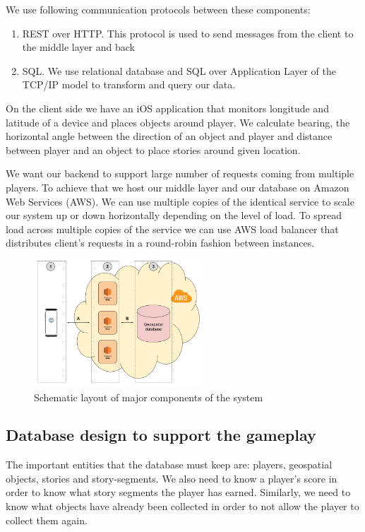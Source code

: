 \documentclass[conference]{IEEEtran}
\begin{document}
We use following communication protocols between these components:

\begin{enumerate}[label=\Alph*]
\item REST over HTTP. This protocol is used to send messages from the client to the middle layer and back
\item SQL. We use relational database and SQL over Application Layer of the TCP/IP model to transform and query our data. 
\end{enumerate}

On the client side we have an iOS application that monitors longitude and latitude of a device and places objects around player. We calculate bearing, the horizontal angle between the direction of an object and player and distance between player and an object to place stories around given location. 

We want our backend to support large number of requests coming from multiple players. To achieve that we host our middle layer and our database on  Amazon Web Services (AWS).  We can use multiple copies of the identical service to scale our system up or down horizontally depending on the level of load.  To spread load across multiple copies of the service we can use AWS load balancer that distributes client’s requests in a round-robin fashion between instances. 

\begin{figure}[h]
\centering
\includegraphics[width=2.5in]{imgs/systemschema.png}
\caption{Schematic layout of major components of the system}
\label{schema}
\end{figure}

\subsection{Database design to support the gameplay}

The important entities that the database must keep are: players, geospatial objects, stories and story-segments. We also need to know a player’s score in order to know what story segments the player has earned. Similarly, we need to know what objects have already been collected in order to not allow the player to collect them again. 
\end{document}
